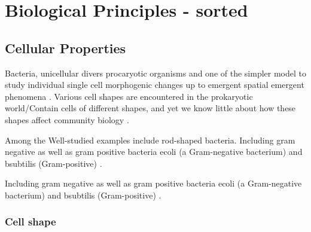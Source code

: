\documentclass{article}
\begin{document}
\section{Biological Principles - sorted}
\subsection{Cellular Properties}

Bacteria, unicellular divers procaryotic organisms and one of the simpler model to study individual single cell morphogenic changes up to emergent spatial emergent phenomena \cite{Vollmer001}.
Various cell shapes are encountered in the prokaryotic world/Contain cells of different shapes, and yet we know little about how these shapes affect community biology \cite{Smith2017}.

Among the Well-studied examples include rod-shaped bacteria. Including gram negative as well as gram positive bacteria \ac{ecoli} (a Gram-negative bacterium) and \ac{bsubtilis} (Gram-positive) \cite{Chang2014}.

Including gram negative as well as gram positive bacteria \ac{ecoli} (a Gram-negative bacterium) and \ac{bsubtilis} (Gram-positive) \cite{Chang2014}.

\subsubsection{Cell shape}
\end{document}
